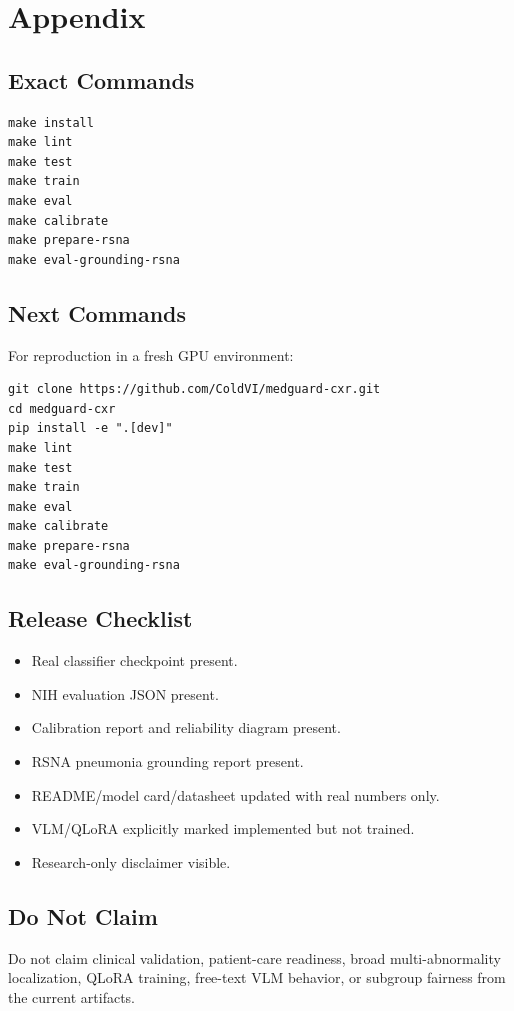 \appendix
\section{Appendix}

\subsection{Exact Commands}

\begin{verbatim}
make install
make lint
make test
make train
make eval
make calibrate
make prepare-rsna
make eval-grounding-rsna
\end{verbatim}

\subsection{Next Commands}

For reproduction in a fresh GPU environment:

\begin{verbatim}
git clone https://github.com/ColdVI/medguard-cxr.git
cd medguard-cxr
pip install -e ".[dev]"
make lint
make test
make train
make eval
make calibrate
make prepare-rsna
make eval-grounding-rsna
\end{verbatim}

\subsection{Release Checklist}

\begin{itemize}
  \item Real classifier checkpoint present.
  \item NIH evaluation JSON present.
  \item Calibration report and reliability diagram present.
  \item RSNA pneumonia grounding report present.
  \item README/model card/datasheet updated with real numbers only.
  \item VLM/QLoRA explicitly marked implemented but not trained.
  \item Research-only disclaimer visible.
\end{itemize}

\subsection{Do Not Claim}

Do not claim clinical validation, patient-care readiness, broad multi-abnormality localization, QLoRA training, free-text VLM behavior, or subgroup fairness from the current artifacts.
